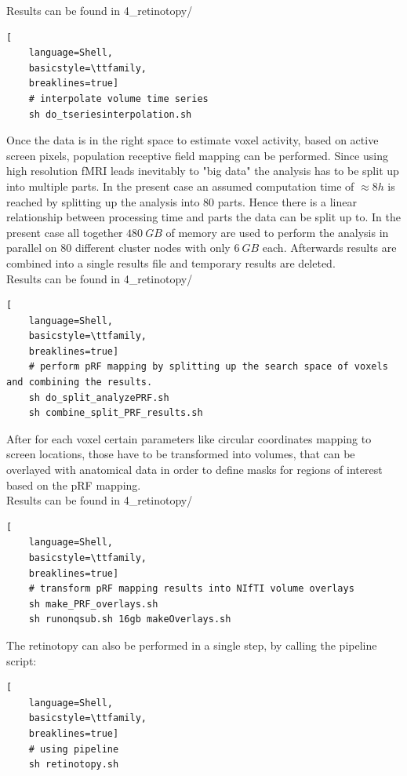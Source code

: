\documentclass[12pt,a4paper]{scrartcl}
\begin{document}
\noindent Results can be found in 4\_retinotopy/\\
\begin{lstlisting}[
    language=Shell,
    basicstyle=\ttfamily,
    breaklines=true]
    # interpolate volume time series
    sh do_tseriesinterpolation.sh
\end{lstlisting}
Once the data is in the right space to estimate voxel activity, based on active screen pixels, population receptive field mapping can be performed. Since using high resolution fMRI leads inevitably to "big data" the analysis has to be split up into multiple parts. In the present case an assumed computation time of $\approx 8h$ is reached by splitting up the analysis into 80 parts. Hence there is a linear relationship between processing time and parts the data can be split up to. In the present case all together $480~GB$ of memory are used to perform the analysis in parallel on 80 different cluster nodes with only $6~GB$ each. Afterwards results are combined into a single results file and temporary results are deleted.\\

\noindent Results can be found in 4\_retinotopy/\\
\begin{lstlisting}[
    language=Shell,
    basicstyle=\ttfamily,
    breaklines=true]
    # perform pRF mapping by splitting up the search space of voxels and combining the results.
    sh do_split_analyzePRF.sh
    sh combine_split_PRF_results.sh
\end{lstlisting}
After for each voxel certain parameters like circular coordinates mapping to screen locations, those have to be transformed into volumes, that can be overlayed with anatomical data in order to define masks for regions of interest based on the pRF mapping.\\

\noindent Results can be found in 4\_retinotopy/\\
\begin{lstlisting}[
    language=Shell,
    basicstyle=\ttfamily,
    breaklines=true]
    # transform pRF mapping results into NIfTI volume overlays
    sh make_PRF_overlays.sh
    sh runonqsub.sh 16gb makeOverlays.sh
\end{lstlisting}
The retinotopy can also be performed in a single step, by calling the pipeline script:
\begin{lstlisting}[
    language=Shell,
    basicstyle=\ttfamily,
    breaklines=true]
    # using pipeline
    sh retinotopy.sh
\end{lstlisting}
\end{document}
